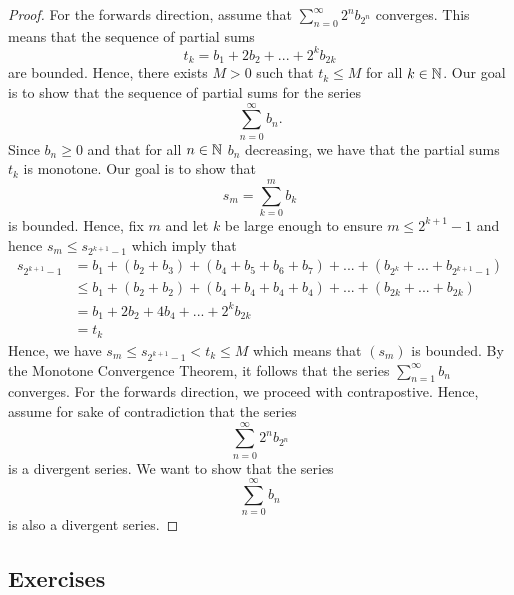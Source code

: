 \begin{proof}
    For the forwards direction, assume that \( \sum_{n=0}^{ \infty} 2^n b_{2^n}\) converges. This means that the sequence of partial sums 
    \[ t_k = b_1 + 2b_2 + ... + 2^k b_{2k}\] are bounded. Hence, there exists \( M > 0 \) such that \( t_k \leq M \) for all \( k \in \mathbb{N} \). Our goal is to show that the sequence of partial sums for the series 
    \[ \sum_{n=0}^{ \infty} b_n.\] 
     Since \( b_n \geq 0 \) and that for all \( n \in \mathbb{N} \) \( b_n \) decreasing, we have that the partial sums \( t_k \) is monotone. Our goal is to show that 
     \[ s_m = \sum_{k=0}^{m} b_k  \]
     is bounded. Hence, fix \( m\) and let \( k \) be large enough to ensure \( m \leq 2^{k+1} - 1\) and hence \( s_m \leq s_{2^{k+1} - 1}\) which imply that 
     \begin{align*}
         s_{2^{k+1}-1}&= b_1 + (b_2 + b_3) + (b_4 + b_5 + b_6 + b_7 ) + ... + (b_{2^k} + ... + b_{2^{k+1}-1})\\ 
                      &\leq b_1 + (b_2 + b_2) + (b_4 + b_4 + b_4 + b_4) + ... + (b_{2k} + ... + b_{2k}) \\
                      &= b_1 + 2b_2 + 4b_4 + ... + 2^k b_{2k} \\
                      &= t_k 
     \end{align*}
     Hence, we have \( s_m \leq s_{2^{k+1} - 1} < t_k \leq M \) which means that \( (s_m)\) is bounded. By the Monotone Convergence Theorem, it follows that the series \( \sum_{n=1}^{ \infty} b_n \) converges. 
     For the forwards direction, we proceed with contrapostive. Hence, assume for sake of contradiction that the series 
     \[ \sum_{n=0}^{ \infty} 2^n b_{2^n}\]
     is a divergent series. We want to show that the series 
     \[ \sum_{n=0}^{ \infty} b_n \]
     is also a divergent series.
\end{proof}

\subsection{Exercises}

